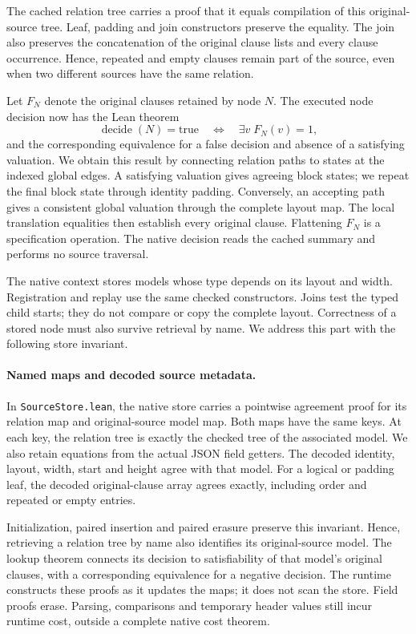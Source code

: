 \documentclass[11pt,a4paper]{article}
\numberwithin{equation}{section}
\theoremstyle{plain}
\theoremstyle{definition}
\theoremstyle{remark}
\begin{document}
The cached relation tree carries a proof that it equals compilation of this original-source tree. Leaf, padding and join constructors preserve the equality. The join also preserves the concatenation of the original clause lists and every clause occurrence. Hence, repeated and empty clauses remain part of the source, even when two different sources have the same relation.

Let $F_N$ denote the original clauses retained by node $N$. The executed node decision now has the Lean theorem
\[
\operatorname{decide}(N)=\mathrm{true}
\quad\Longleftrightarrow\quad
\exists v\;F_N(v)=1,
\]
and the corresponding equivalence for a false decision and absence of a satisfying valuation. We obtain this result by connecting relation paths to states at the indexed global edges. A satisfying valuation gives agreeing block states; we repeat the final block state through identity padding. Conversely, an accepting path gives a consistent global valuation through the complete layout map. The local translation equalities then establish every original clause. Flattening $F_N$ is a specification operation. The native decision reads the cached summary and performs no source traversal.

The native context stores models whose type depends on its layout and width. Registration and replay use the same checked constructors. Joins test the typed child starts; they do not compare or copy the complete layout. Correctness of a stored node must also survive retrieval by name. We address this part with the following store invariant.

\paragraph{Named maps and decoded source metadata.}
In \texttt{SourceStore.lean}, the native store carries a pointwise agreement proof for its relation map and original-source model map. Both maps have the same keys. At each key, the relation tree is exactly the checked tree of the associated model. We also retain equations from the actual JSON field getters. The decoded identity, layout, width, start and height agree with that model. For a logical or padding leaf, the decoded original-clause array agrees exactly, including order and repeated or empty entries.

Initialization, paired insertion and paired erasure preserve this invariant. Hence, retrieving a relation tree by name also identifies its original-source model. The lookup theorem connects its decision to satisfiability of that model's original clauses, with a corresponding equivalence for a negative decision. The runtime constructs these proofs as it updates the maps; it does not scan the store. Field proofs erase. Parsing, comparisons and temporary header values still incur runtime cost, outside a complete native cost theorem.
\end{document}
